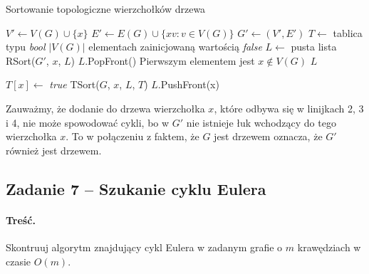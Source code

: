 \begin{algorithm}[H]
	\caption{Sortowanie topologiczne wierzchołków drzewa}
	\begin{algorithmic}[1]
		\State $V' \gets V(G) \cup \{x\}$
		\State $E' \gets E(G) \cup \{xv : v \in V(G)\}$
		\State $G' \gets (V', E')$
		\State $T \gets$ tablica typu \textit{bool} $|V(G)|$ elementach zainicjowaną wartością 
		\textit{false}
		\State $L \gets$ pusta lista
		\State RSort($G'$, $x$, $L$)
		\State $L$.PopFront() \Comment Pierwszym elementem jest $x \not \in V(G)$
		\State \Return $L$
		\EndProcedure
		
		\State $T[x] \gets$ \textit{true}
		\State TSort($G$, $x$, $L$, $T$)
		\EndIf
		\EndWhile
		\State $L$.PushFront(x)
		\EndProcedure
	\end{algorithmic}
	\label{alg:Zadanie26}
\end{algorithm}

Zauważmy, że dodanie do drzewa wierzchołka $x$, które odbywa się w linijkach 2, 3 i 4, nie może spowodować
cykli, bo w $G'$ nie istnieje łuk wchodzący do tego wierzchołka $x$. To w połączeniu z faktem, 
że $G$ jest drzewem oznacza, że $G'$ również jest drzewem.

\subsection{Zadanie 7 -- Szukanie cyklu Eulera}
\paragraph{Treść.} Skontruuj algorytm znajdujący cykl Eulera 
w zadanym grafie o $m$ krawędziach w czasie $O(m)$.

